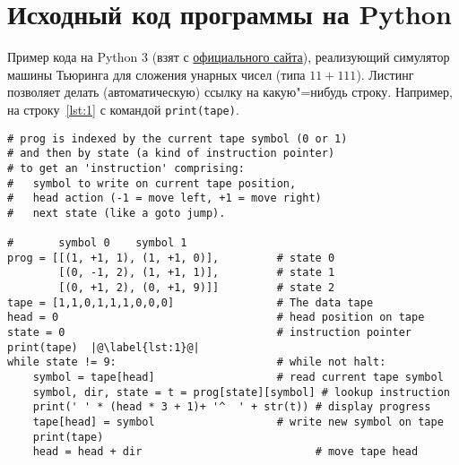 
\chapter{Исходный код программы на Python}
\label{app:Python}



Пример кода на Python 3 (взят с \href{http://python3.codes/alan-turings-automatic-machine/}{официального сайта}), реализующий симулятор машины Тьюринга для сложения унарных чисел (типа $11 + 111$).
Листинг позволяет делать (автоматическую) ссылку на какую"=нибудь строку. Например, на строку~\ref{lst:1} с командой \texttt{print(tape)}.

\begin{lstlisting}[style=Python]
# prog is indexed by the current tape symbol (0 or 1) 
# and then by state (a kind of instruction pointer) 
# to get an 'instruction' comprising:
#   symbol to write on current tape position,
#   head action (-1 = move left, +1 = move right)
#   next state (like a goto jump).

#       symbol 0    symbol 1
prog = [[(1, +1, 1), (1, +1, 0)],         # state 0
		[(0, -1, 2), (1, +1, 1)],         # state 1
		[(0, +1, 2), (0, +1, 9)]]         # state 2
tape = [1,1,0,1,1,1,0,0,0]                # The data tape
head = 0                                  # head position on tape
state = 0                                 # instruction pointer
print(tape)  |@\label{lst:1}@|
while state != 9:                         # while not halt:
	symbol = tape[head]                   # read current tape symbol
	symbol, dir, state = t = prog[state][symbol] # lookup instruction
	print(' ' * (head * 3 + 1)+ '^  ' + str(t)) # display progress
	tape[head] = symbol                   # write new symbol on tape
	print(tape)
	head = head + dir                           # move tape head
\end{lstlisting}


